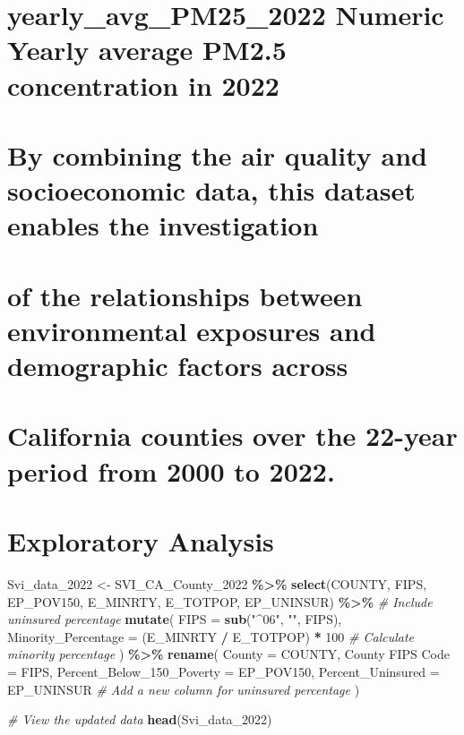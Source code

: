 \documentclass[
]{article}
\newenvironment{Shaded}{\begin{snugshade}}{\end{snugshade}}
\newcommand{\AttributeTok}[1]{\textcolor[rgb]{0.13,0.29,0.53}{#1}}
\newcommand{\CommentTok}[1]{\textcolor[rgb]{0.56,0.35,0.01}{\textit{#1}}}
\newcommand{\DecValTok}[1]{\textcolor[rgb]{0.00,0.00,0.81}{#1}}
\newcommand{\FunctionTok}[1]{\textcolor[rgb]{0.13,0.29,0.53}{\textbf{#1}}}
\newcommand{\NormalTok}[1]{#1}
\newcommand{\OtherTok}[1]{\textcolor[rgb]{0.56,0.35,0.01}{#1}}
\newcommand{\SpecialCharTok}[1]{\textcolor[rgb]{0.81,0.36,0.00}{\textbf{#1}}}
\newcommand{\StringTok}[1]{\textcolor[rgb]{0.31,0.60,0.02}{#1}}
\begin{document}
\section{\textbar{} yearly\_avg\_PM25\_2022 \textbar{} Numeric
\textbar{} Yearly average PM2.5 concentration in 2022
\textbar{}}\label{yearly_avg_pm25_2022-numeric-yearly-average-pm2.5-concentration-in-2022}

\section{By combining the air quality and socioeconomic data, this
dataset enables the
investigation}\label{by-combining-the-air-quality-and-socioeconomic-data-this-dataset-enables-the-investigation}

\section{of the relationships between environmental exposures and
demographic factors
across}\label{of-the-relationships-between-environmental-exposures-and-demographic-factors-across}

\section{California counties over the 22-year period from 2000 to
2022.}\label{california-counties-over-the-22-year-period-from-2000-to-2022.}

\newpage

\section{Exploratory Analysis}\label{exploratory-analysis}

\begin{Shaded}
\begin{Highlighting}[]
\NormalTok{Svi\_data\_2022 }\OtherTok{\textless{}{-}}\NormalTok{ SVI\_CA\_County\_2022 }\SpecialCharTok{\%\textgreater{}\%}
  \FunctionTok{select}\NormalTok{(COUNTY, FIPS, EP\_POV150, E\_MINRTY, E\_TOTPOP, EP\_UNINSUR) }\SpecialCharTok{\%\textgreater{}\%} \CommentTok{\# Include uninsured percentage}
  \FunctionTok{mutate}\NormalTok{(}
    \AttributeTok{FIPS =} \FunctionTok{sub}\NormalTok{(}\StringTok{"\^{}06"}\NormalTok{, }\StringTok{""}\NormalTok{, FIPS),}
    \AttributeTok{Minority\_Percentage =}\NormalTok{ (E\_MINRTY }\SpecialCharTok{/}\NormalTok{ E\_TOTPOP) }\SpecialCharTok{*} \DecValTok{100} \CommentTok{\# Calculate minority percentage}
\NormalTok{  ) }\SpecialCharTok{\%\textgreater{}\%}
  \FunctionTok{rename}\NormalTok{(}
    \AttributeTok{County =}\NormalTok{ COUNTY,}
    \StringTok{\textasciigrave{}}\AttributeTok{County FIPS Code}\StringTok{\textasciigrave{}} \OtherTok{=}\NormalTok{ FIPS,}
    \AttributeTok{Percent\_Below\_150\_Poverty =}\NormalTok{ EP\_POV150,}
    \AttributeTok{Percent\_Uninsured =}\NormalTok{ EP\_UNINSUR }\CommentTok{\# Add a new column for uninsured percentage}
\NormalTok{  )}

\CommentTok{\# View the updated data}
\FunctionTok{head}\NormalTok{(Svi\_data\_2022)}
\end{Highlighting}
\end{Shaded}
\end{document}
